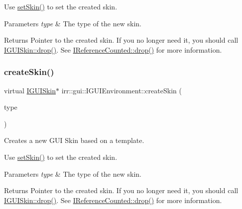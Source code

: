 Use \hyperlink{classirr_1_1gui_1_1IGUIEnvironment_ae7042c520e848643e080ad4532797f23}{set\+Skin()} to set the created skin. 
\begin{DoxyParams}{Parameters}
{\em type} & The type of the new skin. \\
\hline
\end{DoxyParams}
\begin{DoxyReturn}{Returns}
Pointer to the created skin. If you no longer need it, you should call \hyperlink{classirr_1_1IReferenceCounted_a03856a09355b89d178090c4a5f738543}{I\+G\+U\+I\+Skin\+::drop()}. See \hyperlink{classirr_1_1IReferenceCounted_a03856a09355b89d178090c4a5f738543}{I\+Reference\+Counted\+::drop()} for more information. 
\end{DoxyReturn}
\mbox{\label{classirr_1_1gui_1_1IGUIEnvironment_a824099cd1ba9dd4b95e40dd1b15244f1}} 
\subsubsection{\texorpdfstring{create\+Skin()}{createSkin()}\hspace{0.1cm}{\footnotesize\ttfamily [2/2]}}
{\footnotesize\ttfamily virtual \hyperlink{classirr_1_1gui_1_1IGUISkin}{I\+G\+U\+I\+Skin}$\ast$ irr\+::gui\+::\+I\+G\+U\+I\+Environment\+::create\+Skin (\begin{DoxyParamCaption}\item[{\hyperlink{namespaceirr_1_1gui_a7b4619db540cbdf96e81023893b4eca5}{E\+G\+U\+I\+\_\+\+S\+K\+I\+N\+\_\+\+T\+Y\+PE}}]{type }\end{DoxyParamCaption})\hspace{0.3cm}{\ttfamily [pure virtual]}}



Creates a new G\+UI Skin based on a template. 

Use \hyperlink{classirr_1_1gui_1_1IGUIEnvironment_ae7042c520e848643e080ad4532797f23}{set\+Skin()} to set the created skin. 
\begin{DoxyParams}{Parameters}
{\em type} & The type of the new skin. \\
\hline
\end{DoxyParams}
\begin{DoxyReturn}{Returns}
Pointer to the created skin. If you no longer need it, you should call \hyperlink{classirr_1_1IReferenceCounted_a03856a09355b89d178090c4a5f738543}{I\+G\+U\+I\+Skin\+::drop()}. See \hyperlink{classirr_1_1IReferenceCounted_a03856a09355b89d178090c4a5f738543}{I\+Reference\+Counted\+::drop()} for more information. 
\end{DoxyReturn}
\mbox{\label{classirr_1_1gui_1_1IGUIEnvironment_a896fbfcbad5ccf187a835827b439da93}} 
